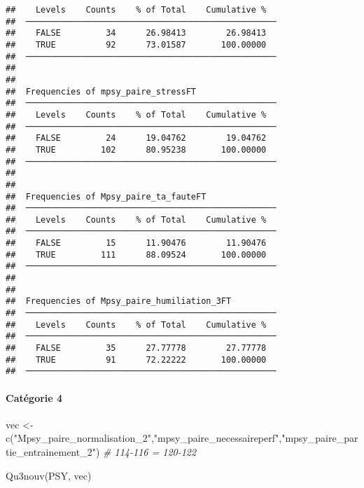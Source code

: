 \documentclass[
]{article}
\newenvironment{Shaded}{\begin{snugshade}}{\end{snugshade}}
\newcommand{\CommentTok}[1]{\textcolor[rgb]{0.56,0.35,0.01}{\textit{#1}}}
\newcommand{\FunctionTok}[1]{\textcolor[rgb]{0.00,0.00,0.00}{#1}}
\newcommand{\NormalTok}[1]{#1}
\newcommand{\OtherTok}[1]{\textcolor[rgb]{0.56,0.35,0.01}{#1}}
\newcommand{\StringTok}[1]{\textcolor[rgb]{0.31,0.60,0.02}{#1}}
\begin{document}
\begin{verbatim}
##    Levels    Counts    % of Total    Cumulative %   
##  ────────────────────────────────────────────────── 
##    FALSE         34      26.98413        26.98413   
##    TRUE          92      73.01587       100.00000   
##  ────────────────────────────────────────────────── 
## 
## 
##  Frequencies of mpsy_paire_stressFT                 
##  ────────────────────────────────────────────────── 
##    Levels    Counts    % of Total    Cumulative %   
##  ────────────────────────────────────────────────── 
##    FALSE         24      19.04762        19.04762   
##    TRUE         102      80.95238       100.00000   
##  ────────────────────────────────────────────────── 
## 
## 
##  Frequencies of Mpsy_paire_ta_fauteFT               
##  ────────────────────────────────────────────────── 
##    Levels    Counts    % of Total    Cumulative %   
##  ────────────────────────────────────────────────── 
##    FALSE         15      11.90476        11.90476   
##    TRUE         111      88.09524       100.00000   
##  ────────────────────────────────────────────────── 
## 
## 
##  Frequencies of Mpsy_paire_humiliation_3FT          
##  ────────────────────────────────────────────────── 
##    Levels    Counts    % of Total    Cumulative %   
##  ────────────────────────────────────────────────── 
##    FALSE         35      27.77778        27.77778   
##    TRUE          91      72.22222       100.00000   
##  ──────────────────────────────────────────────────
\end{verbatim}

\hypertarget{catuxe9gorie-4}{%
\paragraph{Catégorie 4}\label{catuxe9gorie-4}}

\begin{Shaded}
\begin{Highlighting}[]
\NormalTok{vec }\OtherTok{\textless{}{-}} \FunctionTok{c}\NormalTok{(}\StringTok{"Mpsy\_paire\_normalisation\_2"}\NormalTok{,}\StringTok{"mpsy\_paire\_necessaireperf"}\NormalTok{,}\StringTok{"mpsy\_paire\_partie\_entrainement\_2"}\NormalTok{) }\CommentTok{\# 114{-}116 = 120{-}122}

\FunctionTok{Qu3nouv}\NormalTok{(PSY, vec)}
\end{Highlighting}
\end{Shaded}
\end{document}

